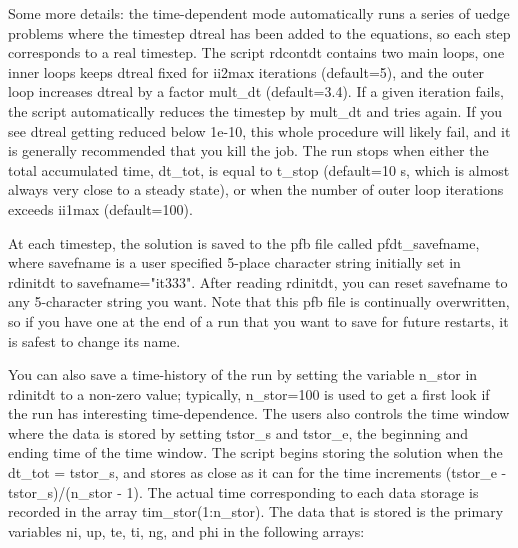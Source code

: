 \documentclass [12pt]{article}
\def\hsa{\hskip.4truein}
\begin{document}
Some more details: the time-dependent mode automatically runs a series of
uedge problems where the timestep {\sf dtreal} has been added to the
equations, so each step corresponds to a real timestep.  The script {\sf
  rdcontdt} contains two main loops, one inner loops keeps {\sf dtreal} fixed
for {\sf ii2max} iterations (default=5), and the outer loop increases {\sf
  dtreal} by a factor {\sf mult\_dt} (default=3.4).  If a given iteration
fails, the script automatically reduces the timestep by {\sf mult\_dt} and
tries again.  If you see {\sf dtreal} getting reduced below 1e-10, this whole
procedure will likely fail, and it is generally recommended that you kill the
job.  The run stops when either the total accumulated time, {\sf dt\_tot}, is
equal to {\sf t\_stop} (default=10 s, which is almost always very close to a
steady state), or when the number of outer loop iterations exceeds {\sf
  ii1max} (default=100).

At each timestep, the solution is saved to the pfb file called {\sf
  pfdt\_savefname}, where savefname is a user specified 5-place character
string initially set in {\sf rdinitdt} to {\sf savefname="it333"}.  After
reading {\sf rdinitdt}, you can reset savefname to any 5-character string you
want.  Note that this pfb file is continually overwritten, so if you have one
at the end of a run that you want to save for future restarts, it is safest to
change its name.

You can also save a time-history of the run by setting the variable {\sf
  n\_stor} in {\sf rdinitdt} to a non-zero value; typically, {\sf n\_stor=100}
is used to get a first look if the run has interesting time-dependence.  The
users also controls the time window where the data is stored by setting {\sf
  tstor\_s} and {\sf tstor\_e}, the beginning and ending time of the time
window.  The script begins storing the solution when the {\sf dt\_tot =
  tstor\_s}, and stores as close as it can for the time increments {\sf
  (tstor\_e - tstor\_s)/(n\_stor - 1)}.  The actual time corresponding to each
data storage is recorded in the array {\sf tim\_stor(1:n\_stor)}.  The data
that is stored is the primary variables {\sf ni, up, te, ti, ng,} and {\sf
  phi} in the following arrays:
%
\end{document}
